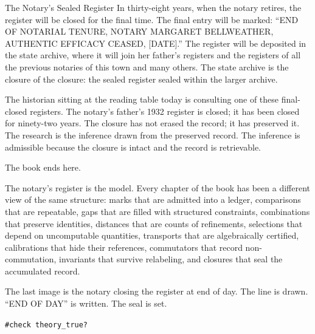 \begin{coda}{The Notary's Sealed Register}
In thirty-eight years, when the notary retires, the register will
be closed for the final time. The final entry will be marked: ``END
OF NOTARIAL TENURE, NOTARY MARGARET BELLWEATHER, AUTHENTIC
EFFICACY CEASED, [DATE].'' The register will be deposited in the
state archive, where it will join her father's registers and the
registers of all the previous notaries of this town and many
others. The state archive is the closure of the closure: the
sealed register sealed within the larger archive.

The historian sitting at the reading table today is consulting one
of these final-closed registers. The notary's father's 1932
register is closed; it has been closed for ninety-two years. The
closure has not erased the record; it has preserved it. The
research is the inference drawn from the preserved record. The
inference is admissible because the closure is intact and the
record is retrievable.

\bigskip

The book ends here.

The notary's register is the model. Every chapter of the book has
been a different view of the same structure: marks that are
admitted into a ledger, comparisons that are repeatable, gaps that
are filled with structured constraints, combinations that preserve
identities, distances that are counts of refinements, selections
that depend on uncomputable quantities, transports that are
algebraically certified, calibrations that hide their references,
commutators that record non-commutation, invariants that survive
relabeling, and closures that seal the accumulated record.

The last image is the notary closing the register at end of day.
The line is drawn. ``END OF DAY'' is written. The seal is set.

\bigskip

\texttt{\#check theory\_true?}

\end{coda}
